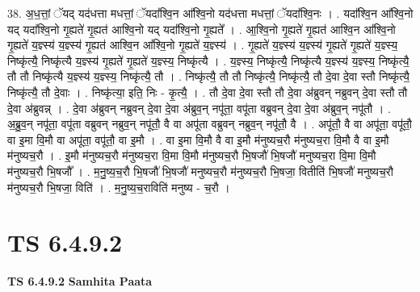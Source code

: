 \documentclass[17pt]{extarticle}
\begin{document}
38. अ॒ध॒त्तां॒ ॅयद् यद॑धत्ता मधत्तां॒ ॅयदा᳚श्वि॒न आ᳚श्वि॒नो यद॑धत्ता मधत्तां॒ ॅयदा᳚श्वि॒नः । . यदा᳚श्वि॒न आ᳚श्वि॒नो यद् यदा᳚श्वि॒नो गृ॒ह्यते॑ गृ॒ह्यत॑ आश्वि॒नो यद् यदा᳚श्वि॒नो गृ॒ह्यते᳚ । . आ॒श्वि॒नो गृ॒ह्यते॑ गृ॒ह्यत॑ आश्वि॒न आ᳚श्वि॒नो गृ॒ह्यते॑ य॒ज्ञ्स्य॑ य॒ज्ञ्स्य॑ गृ॒ह्यत॑ आश्वि॒न आ᳚श्वि॒नो गृ॒ह्यते॑ य॒ज्ञ्स्य॑ । . गृ॒ह्यते॑ य॒ज्ञ्स्य॑ य॒ज्ञ्स्य॑ गृ॒ह्यते॑ गृ॒ह्यते॑ य॒ज्ञ्स्य॒ निष्कृ॑त्यै॒ निष्कृ॑त्यै य॒ज्ञ्स्य॑ गृ॒ह्यते॑ गृ॒ह्यते॑ य॒ज्ञ्स्य॒ निष्कृ॑त्यै । . य॒ज्ञ्स्य॒ निष्कृ॑त्यै॒ निष्कृ॑त्यै य॒ज्ञ्स्य॑ य॒ज्ञ्स्य॒ निष्कृ॑त्यै॒ तौ तौ निष्कृ॑त्यै य॒ज्ञ्स्य॑ य॒ज्ञ्स्य॒ निष्कृ॑त्यै॒ तौ । . निष्कृ॑त्यै॒ तौ तौ निष्कृ॑त्यै॒ निष्कृ॑त्यै॒ तौ दे॒वा दे॒वा स्तौ निष्कृ॑त्यै॒ निष्कृ॑त्यै॒ तौ दे॒वाः । . निष्कृ॑त्या॒ इति॒ निः - कृ॒त्यै॒ । . तौ दे॒वा दे॒वा स्तौ तौ दे॒वा अ॑ब्रुवन् नब्रुवन् दे॒वा स्तौ तौ दे॒वा अ॑ब्रुवन्न् । . दे॒वा अ॑ब्रुवन् नब्रुवन् दे॒वा दे॒वा अ॑ब्रुव॒न् नपू॑ता॒ वपू॑ता वब्रुवन् दे॒वा दे॒वा अ॑ब्रुव॒न् नपू॑तौ । . अ॒ब्रु॒व॒न् नपू॑ता॒ वपू॑ता वब्रुवन् नब्रुव॒न् नपू॑तौ॒ वै वा अपू॑ता वब्रुवन् नब्रुव॒न् नपू॑तौ॒ वै । . अपू॑तौ॒ वै वा अपू॑ता॒ वपू॑तौ॒ वा इ॒मा वि॒मौ वा अपू॑ता॒ वपू॑तौ॒ वा इ॒मौ । . वा इ॒मा वि॒मौ वै वा इ॒मौ म॑नुष्यच॒रौ म॑नुष्यच॒रा वि॒मौ वै वा इ॒मौ म॑नुष्यच॒रौ । . इ॒मौ म॑नुष्यच॒रौ म॑नुष्यच॒रा वि॒मा वि॒मौ म॑नुष्यच॒रौ भि॒षजौ॑ भि॒षजौ॑ मनुष्यच॒रा वि॒मा वि॒मौ म॑नुष्यच॒रौ भि॒षजौ᳚ । . म॒नु॒ष्य॒च॒रौ भि॒षजौ॑ भि॒षजौ॑ मनुष्यच॒रौ म॑नुष्यच॒रौ भि॒षजा॒ वितीति॑ भि॒षजौ॑ मनुष्यच॒रौ म॑नुष्यच॒रौ भि॒षजा॒ विति॑ । . म॒नु॒ष्य॒च॒राविति॑ मनुष्य - च॒रौ । \newline
\pagebreak
{}

\section{ TS 6.4.9.2 }

\textbf{TS 6.4.9.2 } \newline
\textbf{Samhita Paata} \newline
\end{document}
